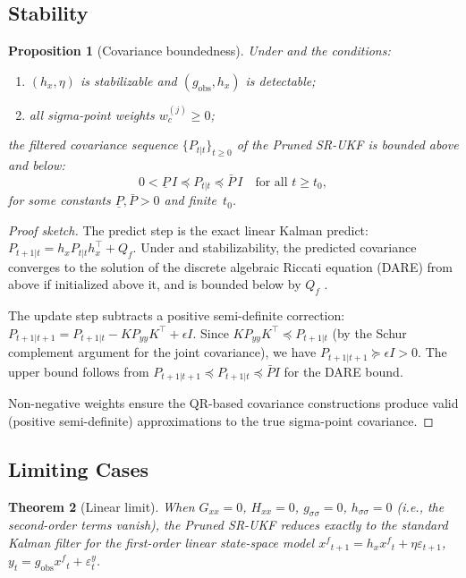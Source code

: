 \documentclass[12pt,a4paper]{article}
\newtheorem{theorem}{Theorem}[section]
\newtheorem{proposition}[theorem]{Proposition}
\newcommand{\xf}{{x^{f}}}
\newcommand{\hx}{h_x}
\newcommand{\Gxx}{G_{xx}}
\newcommand{\Hxx}{H_{xx}}
\newcommand{\gss}{{g_{\sigma\sigma}}}
\newcommand{\hsig}{{h_{\sigma\sigma}}}
\begin{document}
\subsection{Stability}\label{sec:stability}

\begin{proposition}[Covariance boundedness]\label{prop:stability}
Under  and the conditions:
\begin{enumerate}[label=(\roman*),nosep]
\item $(h_x, \eta)$ is stabilizable and
$(g_{\mathrm{obs}}, h_x)$ is detectable;
\item all sigma-point weights $w_c^{(j)} \geq 0$;
\end{enumerate}
the filtered covariance sequence $\{P_{t|t}\}_{t \geq 0}$ of the
Pruned SR-UKF is bounded above and below:
\begin{equation}
0 < \underline{P}\,I \preceq P_{t|t} \preceq \bar{P}\,I
\quad \text{for all } t \geq t_0,
\end{equation}
for some constants $\underline{P}, \bar{P} > 0$ and finite~$t_0$.
\end{proposition}

\begin{proof}[Proof sketch]
The predict step is the exact linear Kalman predict:
$P_{t+1|t} = \hx P_{t|t} \hx^\top + Q_f$.
Under  and stabilizability, the predicted covariance
converges to the solution of the discrete algebraic Riccati equation
(DARE) from above if initialized above it, and is bounded below by
$Q_f$ \citep[Theorem~4.4]{anderson2012optimal}.

The update step subtracts a positive semi-definite correction:
$P_{t+1|t+1} = P_{t+1|t} - K P_{yy} K^\top + \epsilon I$.
Since $K P_{yy} K^\top \preceq P_{t+1|t}$ (by the Schur complement
argument for the joint covariance), we have
$P_{t+1|t+1} \succeq \epsilon I > 0$.
The upper bound follows from $P_{t+1|t+1} \preceq P_{t+1|t}
\preceq \bar{P} I$ for the DARE bound.

Non-negative weights ensure the QR-based covariance constructions
produce valid (positive semi-definite) approximations to the true
sigma-point covariance.
\end{proof}

\subsection{Limiting Cases}

\begin{theorem}[Linear limit]\label{thm:linear}
When $\Gxx = 0$, $\Hxx = 0$, $\gss = 0$, $\hsig = 0$
(i.e., the second-order terms vanish), the Pruned SR-UKF reduces
exactly to the standard Kalman filter for the first-order linear
state-space model
$\xf_{t+1} = \hx \xf_t + \eta\varepsilon_{t+1}$,
$y_t = g_{\mathrm{obs}} \xf_t + \varepsilon_t^y$.
\end{theorem}
\end{document}
